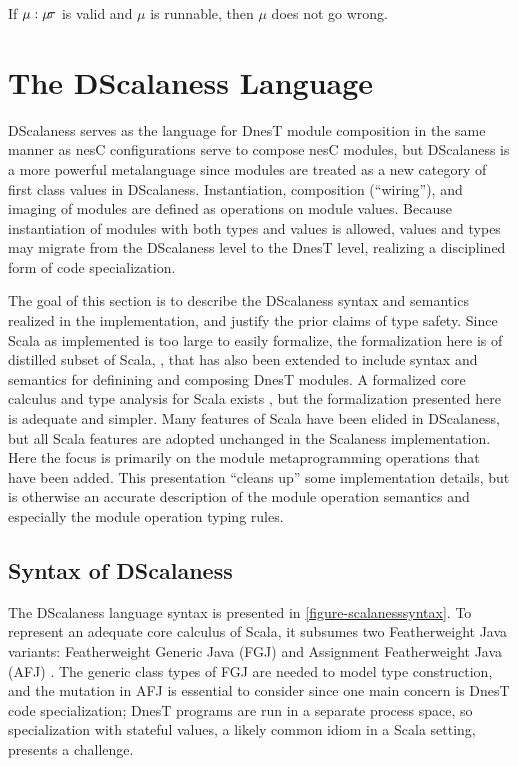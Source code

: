 \begin{conject}
  If $\mu : \mu\!\tau$ is valid and $\mu$ is runnable, then $\mu$ does not go wrong.
\end{conject}

\declmodtypingfig

\section{The DScalaness Language}
\label{section-dscalaness-theory}

DScalaness serves as the language for DnesT module composition in the same manner as nesC
configurations serve to compose nesC modules, but DScalaness is a more powerful metalanguage
since modules are treated as a new category of first class values in DScalaness. Instantiation,
composition (``wiring''), and imaging of modules are defined as operations on module values.
Because instantiation of modules with both types and values is allowed, values and types may
migrate from the DScalaness level to the DnesT level, realizing a disciplined form of code
specialization.

The goal of this section is to describe the DScalaness syntax and semantics realized in the
implementation, and justify the prior claims of type safety. Since Scala as implemented is too
large to easily formalize, the formalization here is of distilled subset of Scala,
, that has also been extended to include syntax and semantics for definining
and composing DnesT modules. A formalized core calculus and type analysis for Scala exists
\cite{Cremet:2006:CCS:2135978.2135980}, but the formalization presented here is adequate and
simpler. Many features of Scala have been elided in DScalaness, but all Scala features are
adopted unchanged in the Scalaness implementation. Here the focus is primarily on the module
metaprogramming operations that have been added. This presentation ``cleans up'' some
implementation details, but is otherwise an accurate description of the module operation
semantics and especially the module operation typing rules.

\subsection{Syntax of DScalaness}
\label{section-dscalaness-syntax}

\scalanesssyntaxfig

The DScalaness language syntax is presented in \autoref{figure-scalanesssyntax}. To represent an
adequate core calculus of Scala, it subsumes two Featherweight Java variants: Featherweight
Generic Java (FGJ) \cite{FJ} and Assignment Featherweight Java (AFJ) \cite{AFJ}. The generic
class types of FGJ are needed to model type construction, and the mutation in AFJ is essential
to consider since one main concern is DnesT code specialization; DnesT programs are run
in a separate process space, so specialization with stateful values, a likely common idiom in a
Scala setting, presents a challenge.

